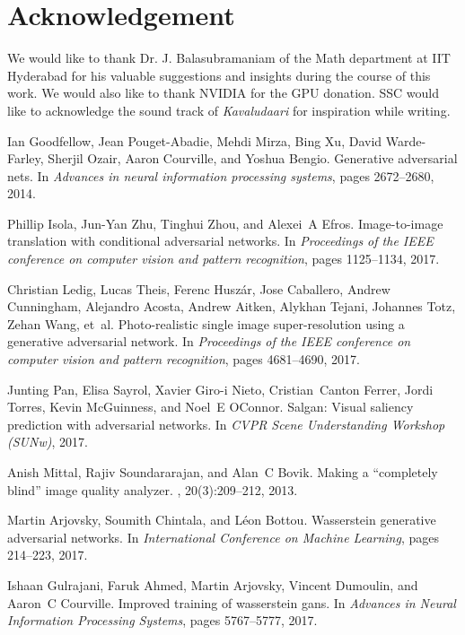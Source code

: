 \documentclass{article}
\begin{document}
\section{Acknowledgement}
We would like to thank Dr. J. Balasubramaniam of the Math department at IIT Hyderabad for his valuable suggestions and insights during the course of this work. We would also like to thank NVIDIA for the GPU donation. SSC would like to acknowledge the sound track of {\em{Kavaludaari}} for inspiration while writing.
\begin{thebibliography}{10}

Ian Goodfellow, Jean Pouget-Abadie, Mehdi Mirza, Bing Xu, David Warde-Farley,
  Sherjil Ozair, Aaron Courville, and Yoshua Bengio.
\newblock Generative adversarial nets.
\newblock In {\em Advances in neural information processing systems}, pages
  2672--2680, 2014.

Phillip Isola, Jun-Yan Zhu, Tinghui Zhou, and Alexei~A Efros.
\newblock Image-to-image translation with conditional adversarial networks.
\newblock In {\em Proceedings of the IEEE conference on computer vision and
  pattern recognition}, pages 1125--1134, 2017.

Christian Ledig, Lucas Theis, Ferenc Husz{\'a}r, Jose Caballero, Andrew
  Cunningham, Alejandro Acosta, Andrew Aitken, Alykhan Tejani, Johannes Totz,
  Zehan Wang, et~al.
\newblock Photo-realistic single image super-resolution using a generative
  adversarial network.
\newblock In {\em Proceedings of the IEEE conference on computer vision and
  pattern recognition}, pages 4681--4690, 2017.

Junting Pan, Elisa Sayrol, Xavier Giro-i Nieto, Cristian~Canton Ferrer, Jordi
  Torres, Kevin McGuinness, and Noel~E OConnor.
\newblock Salgan: Visual saliency prediction with adversarial networks.
\newblock In {\em CVPR Scene Understanding Workshop (SUNw)}, 2017.

Anish Mittal, Rajiv Soundararajan, and Alan~C Bovik.
\newblock Making a “completely blind” image quality analyzer.
, 20(3):209--212, 2013.

Martin Arjovsky, Soumith Chintala, and L{\'e}on Bottou.
\newblock Wasserstein generative adversarial networks.
\newblock In {\em International Conference on Machine Learning}, pages
  214--223, 2017.

Ishaan Gulrajani, Faruk Ahmed, Martin Arjovsky, Vincent Dumoulin, and Aaron~C
  Courville.
\newblock Improved training of wasserstein gans.
\newblock In {\em Advances in Neural Information Processing Systems}, pages
  5767--5777, 2017.


\end{thebibliography}
\end{document}
